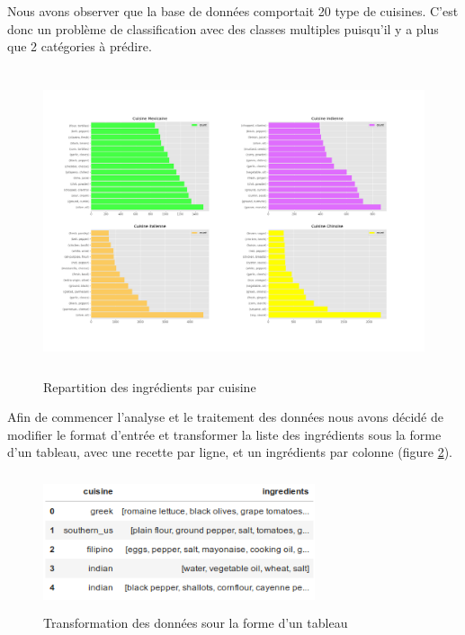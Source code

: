 \documentclass[12pt]{article}
\begin{document}
Nous avons observer que la base de données comportait 20 type de cuisines. C'est donc un problème de classification avec des classes multiples puisqu'il y a plus que 2 catégories à prédire.

\begin{figure}[h]
	\begin{center}
	\includegraphics[width=15cm,height=9cm]{./exemple_differences_ingredients.png}
	\end{center}
	\caption{Repartition des ingrédients par cuisine}
	\label{label-image2}
\end{figure}
Afin de commencer l'analyse et le traitement des données nous avons décidé de modifier le format d'entrée et transformer la liste des ingrédients sous la forme d'un tableau, avec une recette par ligne, et un ingrédients par colonne (figure \ref{label-image3}).

\begin{figure}[h]
	\begin{center}
	\includegraphics[width=8cm,height=4cm]{./tableau_valeur.png}
	\end{center}
	\caption{Transformation des données sour la forme d'un tableau}
	\label{label-image3}
\end{figure}

\newpage
\end{document}
